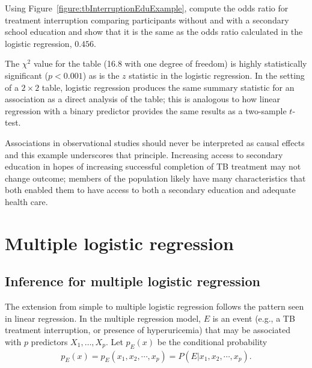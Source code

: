 \begin{exercisewrap}
  \begin{nexercise}
    Using Figure~\ref{figure:tbInterruptionEduExample}, compute the odds ratio for treatment interruption comparing participants without and with a secondary school education and show that it is the same as the odds ratio calculated in the logistic regression, $0.456$.
    \footnotemark{}
  \end{nexercise}
\end{exercisewrap}

The $\chi^2$ value for the table (16.8 with one degree of freedom) is highly statistically significant ($p < 0.001$) as is the $z$ statistic in the logistic regression. In the setting of a $2 \times 2$ table, logistic regression produces the same summary statistic for an association as a direct analysis of the table; this is analogous to how linear regression with a binary predictor provides the same results as a two-sample $t$-test.

Associations in observational studies should never be interpreted as causal effects and this example underscores that principle.  Increasing access to secondary education in hopes of increasing successful completion of TB treatment may not change outcome; members of the population likely have many characteristics that both enabled them to have access to both a secondary education and adequate health care.

\section{Multiple logistic regression}
\label{generalMultipleLogistic}

\subsection{Inference for multiple logistic regression}
\label{inferenceMultipleLogisticRegression}

The extension from simple to multiple logistic regression follows the pattern seen in linear regression.   In the multiple regression model, $E$ is an event (e.g., a TB treatment interruption, or presence of hyperuricemia) that may be associated with $p$ predictors $X_1, \ldots, X_p$. Let $p_E(x)$ be the conditional probability
\begin{align*}
  p_E(x) = p_E(x_1, x_2,\cdots, x_p) = P(E| x_1, x_2,\cdots,x_p).
\end{align*}

